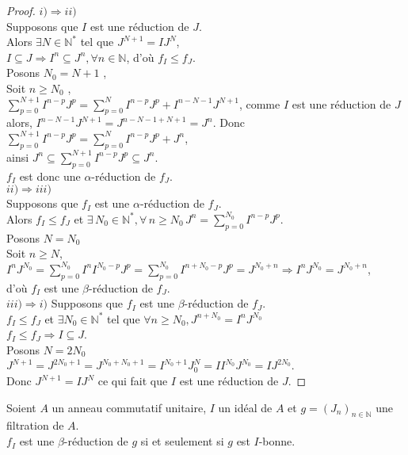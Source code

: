 \begin{proof}
	$i) \Rightarrow ii)$\\
	Supposons que $I$ est une réduction de $J$.\\
	Alors $\exists N \in \mathbb{N^*}$ tel que $J^{N+1} = IJ^N$,\\ $I \subseteq J \Rightarrow I^n \subseteq J^n , \forall n \in \mathbb{N}$, d'où $f_I \leq f_J$.\\
	Posons $N_0 = N+1$ , \\
	Soit $n \geq N_0$ , \\
	$\displaystyle \sum_{p=0}^{N+1}{I^{n-p} J^{p}} = \displaystyle \sum_{p=0}^{N}{I^{n-p} J^{p}} + I^{n-N-1} J^{N+1}$, comme $I$ est une réduction de $J$ alors, $I^{n-N-1} J^{N+1} = J^{n-N-1+N+1} = J^n$. Donc $\displaystyle \sum_{p=0}^{N+1}{I^{n-p} J^{p}} = \displaystyle \sum_{p=0}^{N}{I^{n-p} J^{p}} + J^{n}$,\\ ainsi $J^n \subseteq \displaystyle \sum_{p=0}^{N+1}{I^{n-p} J^{p}} \subseteq J^n$.\\
	$f_I$ est donc une $\alpha$-réduction de $f_J$.\\
	$ii) \Rightarrow iii)$\\
	Supposons que $f_I$ est une $\alpha$-réduction de $f_J$.\\
	Alors $f_I \leq f_J$ et $\exists \, N_0 \in \mathbb{N^*} , \forall \, n \geq N_0 \, J^n = \displaystyle \sum_{p=0}^{N_0}{I^{n-p} J^{p}}$.\\
	Posons $N = N_0$\\
	Soit $n \geq N$, \\
	$I^n J^{N_0} = \displaystyle \sum_{p=0}^{N_0}{I^n I^{N_0-p} J^{p}} = \displaystyle \sum_{p=0}^{N_0}{I^{n+N_0-p} J^{p}} = J^{N_0+n} \Rightarrow I^n J^{N_0} = J^{N_0+n}$,\\d'où $f_I$ est une $\beta$-réduction de $f_J$.\\
	$iii) \Rightarrow i)$
	Supposons que $f_I$ est une $\beta$-réduction de $f_J$.\\
	$f_I \leq f_J$ et $\exists N_0 \in \mathbb{N^*}$ tel que $\forall n \geq N_0 , J^{n+N_0} = I^n J^{N_0}$\\
	$f_I \leq f_J \Rightarrow I \subseteq J$.\\
	Posons $N = 2N_0$\\
	$J^{N+1} = J^{2N_0+1} = J^{N_0+N_0+1} = I^{N_0+1} J^N_0 = I I^{N_0} J^{N_0} = IJ^{2N_0}$.\\ Donc $J^{N+1}= IJ^{N}$ ce qui fait que $I$ est une réduction de $J$.
\end{proof}
\begin{maproposition}
	Soient $A$ un anneau commutatif unitaire, $I$ un idéal de $A$ et $g = (J_n)_{n \in \mathbb{N}}$ une filtration de $A$.\\
	$f_I$ est une $\beta$-réduction de $g$ si et seulement si $g$ est $I$-bonne.
\end{maproposition}

